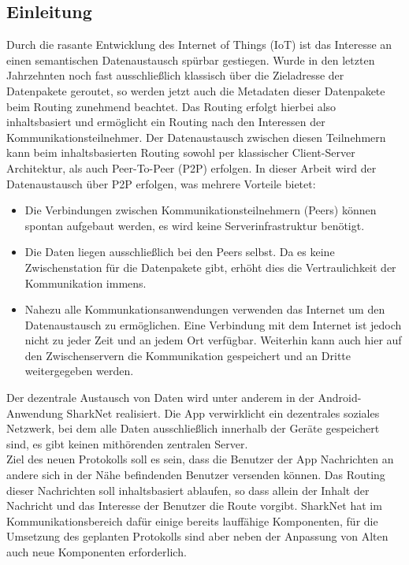


\subsection{Einleitung}
Durch die rasante Entwicklung des Internet of Things (IoT) ist das Interesse an einen semantischen Datenaustausch spürbar gestiegen. Wurde in den letzten Jahrzehnten noch fast ausschließlich klassisch über die Zieladresse der Datenpakete geroutet, so werden jetzt auch die Metadaten dieser Datenpakete beim Routing zunehmend beachtet. Das Routing erfolgt hierbei also inhaltsbasiert und ermöglicht ein Routing nach den Interessen der Kommunikationsteilnehmer. Der Datenaustausch zwischen diesen Teilnehmern kann beim inhaltsbasierten Routing sowohl per klassischer Client-Server Architektur, als auch Peer-To-Peer (P2P) erfolgen. In dieser Arbeit wird der Datenaustausch über P2P erfolgen, was mehrere Vorteile bietet:
\begin{itemize}
\item Die Verbindungen zwischen Kommunikationsteilnehmern (Peers) können spontan aufgebaut werden, es wird keine Serverinfrastruktur benötigt.
\item Die Daten liegen ausschließlich bei den Peers selbst. Da es keine Zwischenstation für die Datenpakete gibt, erhöht dies die Vertraulichkeit der Kommunikation immens. 
\item Nahezu alle Kommunkationsanwendungen verwenden das Internet um den Datenaustausch zu ermöglichen. Eine Verbindung mit dem Internet ist jedoch nicht zu jeder Zeit und an jedem Ort verfügbar. Weiterhin kann auch hier auf den Zwischenservern die Kommunikation gespeichert und an Dritte weitergegeben werden.
\end{itemize}  
Der dezentrale Austausch von Daten wird unter anderem in der Android-Anwendung SharkNet realisiert. Die App verwirklicht ein dezentrales soziales Netzwerk, bei dem alle Daten ausschließlich innerhalb der Geräte gespeichert sind, es gibt keinen mithörenden zentralen Server. \\Ziel des neuen Protokolls soll es sein, dass die Benutzer der App Nachrichten an andere sich in der Nähe befindenden Benutzer versenden können. Das Routing dieser Nachrichten soll inhaltsbasiert ablaufen, so dass allein der Inhalt der Nachricht und das Interesse der Benutzer die Route vorgibt. SharkNet hat im Kommunikationsbereich dafür einige bereits lauffähige Komponenten, für die Umsetzung des geplanten Protokolls sind aber neben der Anpassung von Alten auch neue Komponenten erforderlich. 
\newline [...]
\newpage
